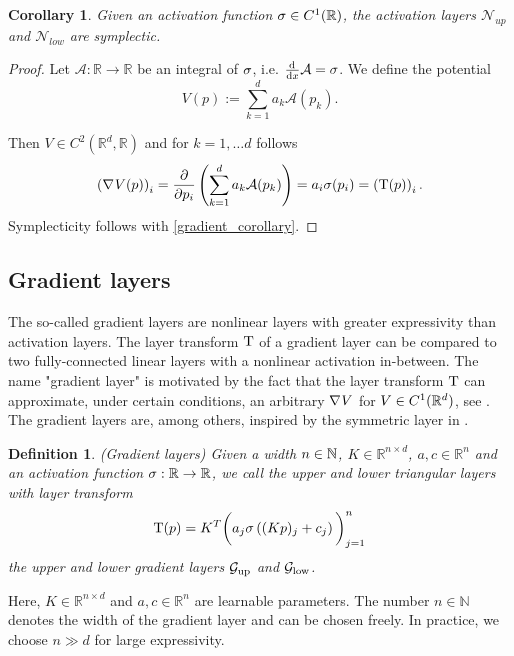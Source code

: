 \documentclass[twoside,a4paper]{article}
\newtheorem{definition}{Definition}
\newtheorem{corollary}{Corollary}
\begin{document}
\begin{corollary}
	Given an activation function $\sigma \in C^1(\mathbb{R})$,
	the activation layers $\mathcal{N}_{up}$ and $\mathcal{N}_{low}$ are symplectic.
\end{corollary}
\begin{proof}
	Let $\mathcal{A}: \mathbb{R} \to \mathbb{R}$ be an integral of $\sigma$, 
	i.e. $\frac{\mathrm{d}^{}}{\mathrm{d}x} \mathcal{A} = \sigma$. We define the potential
	\begin{equation*}
		V(p) := \sum_{k=1}^d a_k \mathcal{A}(p_k)
		.
	\end{equation*}

	Then $V \in C^2(\mathbb{R}^d, \mathbb{R})$ and for $k=1, \dots d$ follows
	\begin{equation*}
		\left( \nabla_{}{V}(p) \right)_i = \frac{\partial }{\partial p_i} \left( \sum_{k=1}^d a_k \mathcal{A}(p_k) \right)
		= a_i \sigma(p_i) = \left( \mathrm{T}(p) \right)_i
		.
	\end{equation*}
	Symplecticity follows with \cref{gradient_corollary}.
\end{proof}

\subsection{Gradient layers}

The so-called gradient layers are nonlinear layers with
greater expressivity than activation layers. The layer transform $\mathrm{T}$
of a gradient layer can be compared to two fully-connected linear layers with a
nonlinear activation in-between. The name "gradient layer" is
motivated by the fact that the layer transform $\mathrm{T}$ can approximate,
under certain conditions, an arbitrary $\nabla_{}{V}$ for $V \in C^1(\mathbb{R}^d)$, 
see \citet[Lemma 4]{Jin2020}. The gradient layers are, among others, inspired
by the symmetric layer in \citet{Ruthotto2020}.

\begin{definition}
	(Gradient layers)
	Given a width $n \in \mathbb{N}$, $K \in \mathbb{R}^{n \times d}$, $a,c \in \mathbb{R}^n$ and
	an activation function $\sigma : \mathbb{R} \to \mathbb{R}$,
	we call the upper and lower triangular layers with layer transform
	\begin{equation*}
		\mathrm{T}(p) = K^T \bigg( a_j \sigma \left( (Kp)_j + c_j \right) \bigg)_{j=1}^n
	\end{equation*}
	the upper and lower gradient layers $\mathcal{G}_{\text{up}}$ and $\mathcal{G}_{\text{low}}$.
\end{definition}
Here, $K \in \mathbb{R}^{n \times d}$ and $a,c \in \mathbb{R}^n$
are learnable parameters. 
The number $n \in \mathbb{N}$ denotes the width of the gradient layer and can be chosen freely.
In practice, we choose $n \gg d$ for large expressivity.
\end{document}
